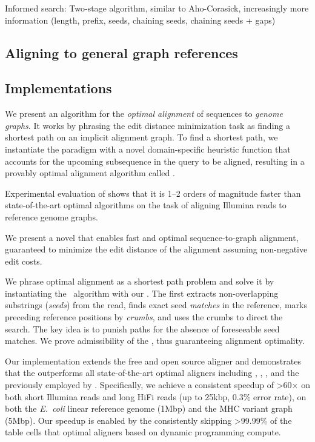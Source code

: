 Informed search: Two-stage algorithm, similar to Aho-Corasick, increasingly more information (length, prefix, seeds, chaining seeds, chaining seeds + gaps)

\subsection{Aligning to general graph references}

\subsection{Implementations}

	
We present an algorithm for the \emph{optimal alignment} of sequences to
\emph{genome graphs}. It works by phrasing the edit distance minimization
task as finding a shortest path on an implicit alignment graph. To find a
shortest path, we instantiate the \A paradigm with a novel domain-specific
heuristic function that accounts for the upcoming subsequence in the query
to be aligned, resulting in a provably optimal alignment algorithm called
\astarix.

Experimental evaluation of \astarix shows that it is 1--2 orders of magnitude
faster than state-of-the-art optimal algorithms on the task of aligning Illumina
reads to reference genome graphs.

We present a novel \A \emph{\seedh} that enables fast and optimal
sequence-to-graph alignment, guaranteed to minimize the edit distance of the
alignment assuming non-negative edit costs.

We phrase optimal alignment as a shortest path problem and solve it by
instantiating the \A~algorithm with our \seedh. The \seedh first extracts
non-overlapping substrings (\emph{seeds}) from the read, finds exact seed
\emph{matches} in the reference, marks preceding reference positions by
\emph{crumbs}, and uses the crumbs to direct the \A search. The key idea is to
punish paths for the absence of foreseeable seed matches. We prove admissibility
of the \seedh, thus guaranteeing alignment optimality.

Our implementation extends the free and open source aligner and demonstrates
that the \seedh outperforms all state-of-the-art optimal aligners including
\graphaligner, \vargas, \pasgal, and the \prefixh previously employed by
\astarix. Specifically, we achieve a consistent speedup of >60$\times$ on both
short Illumina reads and long HiFi reads (up to 25kbp, 0.3\% error rate), on
both the \textit{E.~coli} linear reference genome (1Mbp) and the MHC variant
graph (5Mbp). Our speedup is enabled by the \seedh consistently skipping
>99.99\% of the table cells that optimal aligners based on dynamic programming
compute.


